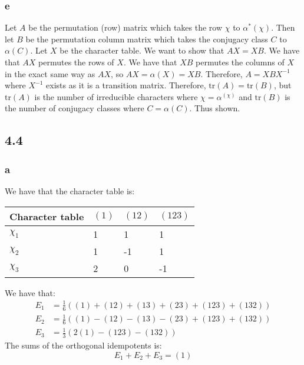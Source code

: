 \documentclass[]{article}
\newcommand{\tr}{\text{tr}}
\begin{document}
\subsubsection*{e}
Let $A$ be the permutation (row) matrix which takes the row $\chi$ to $\alpha^*(\chi)$. Then let $B$ be the permutation column matrix which takes the conjugacy class $C$ to $\alpha(C)$. Let $X$ be the character table. We want to show that $AX = XB$. We have that $AX$ permutes the rows of $X$. We have that $XB$ permutes the columns of $X$ in the exact same way as $AX$, so $AX = \alpha(X) = XB$. Therefore, $A = XBX^{-1}$ where $X^{-1}$ exists as it is a transition matrix. Therefore, $\tr(A) = \tr(B)$, but $\tr(A)$ is the number of irreducible characters where $\chi = \alpha^(\chi)$ and $\tr(B)$ is the number of conjugacy classes where $C = \alpha(C)$. Thus shown. 

\newpage
\subsection*{4.4}
\subsubsection*{a}
We have that the character table is:
\begin{table}[h!]
	\centering
	\begin{tabular}{|l|l|l|l|}
		\hline
		Character table & $(1)$ & $(12)$ & $(123)$ \\ \hline
		$\chi_1$        & 1     & 1     & 1       \\ \hline
		$\chi_2$        & 1     & -1    & 1       \\ \hline
		$\chi_3$        & 2     & 0     & -1      \\ \hline
	\end{tabular}
\end{table}
We have that:
\begin{align*}
	E_1 &= \frac{1}{6}\left((1) + (12) + (13) + (23) + (123) + (132)\right)\\
	E_2 &= \frac{1}{6}\left((1) -(12) -(13) -(23) + (123) + (132)\right)\\
	E_3 &= \frac{1}{3}\left(2(1)  - (123) - (132)\right)
\end{align*}
The sums of the orthogonal idempotents is:
\begin{equation}
	E_1 + E_2 + E_3 = (1)
\end{equation}
\end{document}
